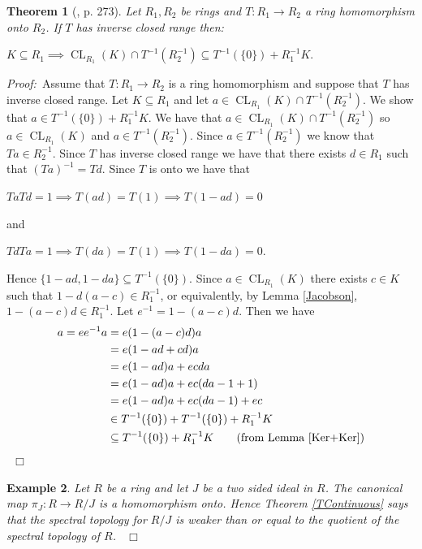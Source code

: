 \documentclass[12pt, oneside]{book}
\newtheorem{theorem}{Theorem}[subsection]
\newtheorem{example}[theorem]{Example}
\newcommand{\proof}{{\noindent \it Proof:~}}
\newcommand{\qed}{\hfill ~$\Box$\\}
\def\CL{\operatorname{CL}}
\begin{document}
\begin{theorem} [\cite{CH3}, p. 273] \label{InverseClosedRange}
\normalfont
\noindent Let $R_1, R_2$ be rings and $T : R_1 \rightarrow R_2$ a ring homomorphism onto $R_2$. 
If $T$ has inverse closed range then:
\begin{center}
$K \subseteq R_1 \implies \CL_{R_1}(K) \cap T^{-1}(R_2^{-1}) \subseteq T^{-1}(\{0\}) + R_1^{-1}K. $
\end{center}
\end{theorem}
\proof \space Assume that $T: R_1 \to R_2$ is a ring homomorphism and suppose 
that $T$ has inverse closed range. Let $K \subseteq R_1$ and let 
$a \in \CL_{R_1}(K) \cap T^{-1}(R_2^{-1})$. We show that $a \in T^{-1}(\{0\})+R_1^{-1}K$.
\vskip 0.3cm
\noindent We have that $a \in \CL_{R_1}(K) \cap T^{-1}(R_2^{-1})$ so $a \in \CL_{R_1}(K)$ and $a \in T^{-1}(R_2^{-1})$. Since $a \in T^{-1}(R_2^{-1})$ we know that $Ta \in R_2^{-1}$. Since $T$ has 
inverse closed range we have that there exists $d \in R_1$ such that $(Ta)^{-1} = Td$.  Since $T$ is onto we have that
\begin{center}
$Ta Td = 1 \implies T(ad) = T(1) \implies T(1 - ad) = 0$
\end{center}
and 
\begin{center}
$Td Ta = 1 \implies T(da) = T(1) \implies T(1 - da) = 0$.
\end{center}
Hence $\{1 - ad, 1 - da \} \subseteq T^{-1}(\{0\}).$
\noindent Since $a \in \CL_{R_1}(K)$ there exists $c \in K$ such that $1-d(a-c) \in R_1^{-1}$, or equivalently, by Lemma \ref{Jacobson}, $1-(a-c)d \in R_1^{-1}$.
\vskip 0.3cm
\noindent Let $e^{-1}=1-(a-c)d$. Then we have
\begin{align*}
a=ee^{-1}a
&=e(1-(a-c)d)a\\
&=e(1-ad+cd)a\\
&=e(1-ad)a+ecda\\
&=e(1-ad)a+ec(da-1+1)\\
&=e(1-ad)a+ec(da-1)+ec\\ 
&\in T^{-1}(\{0\})+T^{-1}(\{0\})+R_1^{-1}K\\ 
&\subseteq T^{-1}(\{0\})+R_1^{-1}K \qquad \text{(from Lemma \ref{Ker+Ker})} 
\end{align*}
\qed

\begin{example}
\normalfont
Let $R$ be a ring and let $J$ be a two sided ideal in $R$. The canonical map 
$\pi_J : R \rightarrow R/J$ is a homomorphism onto. Hence Theorem \ref{TContinuous} says that 
the spectral topology for $R/J$ is weaker than or equal to the quotient of the spectral topology of $R$.
\qed
\end{example}
\end{document}
